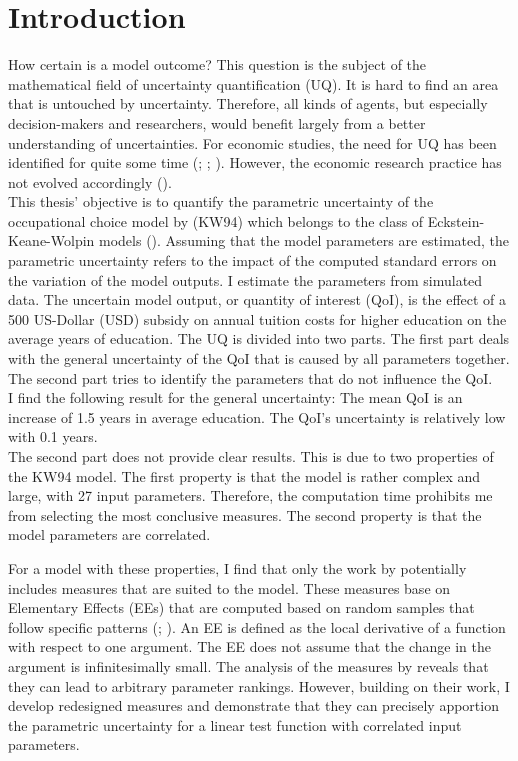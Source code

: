 \section{Introduction}
\thispagestyle{plain} %

How certain is a model outcome? This question is the subject of the mathematical field of uncertainty quantification (UQ). It is hard to find an area that is untouched by uncertainty. Therefore, all kinds of agents, but especially decision-makers and researchers, would benefit largely from a better understanding of uncertainties. For economic studies, the need for UQ  has been identified for quite some time (\cite{Hansen.1996}; \cite{Canova.1994}; \cite{Kydland.1992}). However, the economic research practice has not evolved accordingly (\cite{Harenberg.2019}).\\

\noindent
This thesis' objective is to quantify the parametric uncertainty of the occupational choice model by \cite{Keane.1994} (KW94) which belongs to the class of Eckstein-Keane-Wolpin models (\cite{Aguirregabiria.2010}). Assuming that the model parameters are estimated, the parametric uncertainty refers to the impact of the computed standard errors on the variation of the model outputs. I estimate the parameters from simulated data.
The uncertain model output, or quantity of interest (QoI), is the effect of a 500 US-Dollar (USD) subsidy on annual tuition costs for higher education on the average years of education. The UQ is divided into two parts. The first part deals with the general uncertainty of the QoI that is caused by all parameters together. The second part tries to identify the parameters that do not influence the QoI.\\

\noindent
I find the following result for the general uncertainty: The mean QoI is an increase of 1.5 years in average education. The QoI's uncertainty is relatively low with 0.1 years.\\

\noindent
The second part does not provide clear results. This is due to two properties of the KW94 model.
The first property is that the model is rather complex and large, with 27 input parameters. Therefore, the computation time prohibits me from selecting the most conclusive measures.
The second property is that the model parameters are correlated.


For a model with these properties, I find that only the work by \cite{ge2014efficient} potentially includes measures that are suited to the model. These measures base on Elementary Effects (EEs) that are computed based on random samples that follow specific patterns (\cite{Morris.1991}; \cite{saltelli2010variance}). An EE is defined as the local derivative of a function with respect to one argument. The EE does not assume that the change in the argument is infinitesimally small. The analysis of the measures by \cite{ge2014efficient} reveals that they can lead to arbitrary parameter rankings. However, building on their work, I develop redesigned measures and demonstrate that they can precisely apportion the parametric uncertainty for a linear test function with correlated input parameters.

